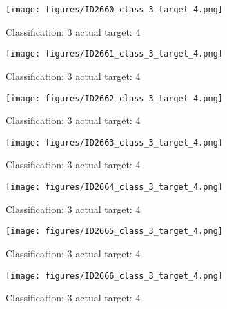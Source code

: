 \begin{figure}[h!]
\begin{center}
\texttt{[image: figures/ID2660\_class\_3\_target\_4.png]}
\end{center}
\caption{ Classification: 3 actual target: 4}
\label{fig:ID2660_class_3_target_4}
\end{figure}
\begin{figure}[h!]
\begin{center}
\texttt{[image: figures/ID2661\_class\_3\_target\_4.png]}
\end{center}
\caption{ Classification: 3 actual target: 4}
\label{fig:ID2661_class_3_target_4}
\end{figure}
\begin{figure}[h!]
\begin{center}
\texttt{[image: figures/ID2662\_class\_3\_target\_4.png]}
\end{center}
\caption{ Classification: 3 actual target: 4}
\label{fig:ID2662_class_3_target_4}
\end{figure}
\begin{figure}[h!]
\begin{center}
\texttt{[image: figures/ID2663\_class\_3\_target\_4.png]}
\end{center}
\caption{ Classification: 3 actual target: 4}
\label{fig:ID2663_class_3_target_4}
\end{figure}
\begin{figure}[h!]
\begin{center}
\texttt{[image: figures/ID2664\_class\_3\_target\_4.png]}
\end{center}
\caption{ Classification: 3 actual target: 4}
\label{fig:ID2664_class_3_target_4}
\end{figure}
\begin{figure}[h!]
\begin{center}
\texttt{[image: figures/ID2665\_class\_3\_target\_4.png]}
\end{center}
\caption{ Classification: 3 actual target: 4}
\label{fig:ID2665_class_3_target_4}
\end{figure}
\begin{figure}[h!]
\begin{center}
\texttt{[image: figures/ID2666\_class\_3\_target\_4.png]}
\end{center}
\caption{ Classification: 3 actual target: 4}
\label{fig:ID2666_class_3_target_4}
\end{figure}
